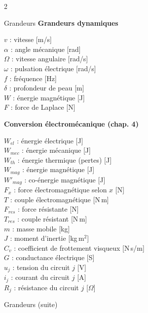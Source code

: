 \documentclass[10pt,a4paper]{article}
\begin{document}
\begin{multicols}{2}
\begin{metbox}{Grandeurs}
\medskip
\textbf{Grandeurs dynamiques}

$v$ : vitesse [m/s] \\
$\alpha$ : angle mécanique [rad] \\
$\Omega$ : vitesse angulaire [rad/s] \\
$\omega$ : pulsation électrique [rad/s] \\
$f$ : fréquence [Hz] \\
$\delta$ : profondeur de peau [m] \\
$W$ : énergie magnétique [J] \\
$F$ : force de Laplace [N]

\medskip
\textbf{Conversion électromécanique (chap. 4)}

$W_{el}$ : énergie électrique [J] \\
$W_{mec}$ : énergie mécanique [J] \\
$W_{th}$ : énergie thermique (pertes) [J] \\
$W_{mag}$ : énergie magnétique [J] \\
$W'_{mag}$ : co-énergie magnétique [J] \\
$F_x$ : force électromagnétique selon $x$ [N] \\
$T$ : couple électromagnétique [N\,m] \\
$F_{res}$ : force résistante [N] \\
$T_{res}$ : couple résistant [N\,m] \\
$m$ : masse mobile [kg] \\
$J$ : moment d'inertie [kg\,m$^2$] \\
$C_v$ : coefficient de frottement visqueux [N\,s/m] \\
$G$ : conductance électrique [S] \\
$u_j$ : tension du circuit $j$ [V] \\
$i_j$ : courant du circuit $j$ [A] \\
$R_j$ : résistance du circuit $j$ [$\Omega$]

\end{metbox}

\begin{metbox}{Grandeurs (suite)}


\end{metbox}
\end{multicols}
\end{document}
